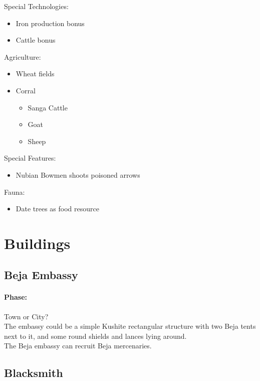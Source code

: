 \documentclass[a4paper,12pt]{scrreprt}
\begin{document}
Special Technologies:

\begin{itemize}
	\item Iron production bonus
	\item Cattle bonus
\end{itemize}

Agriculture:

\begin{itemize}
	\item Wheat fields
	\item Corral
	\begin{itemize}
		\item Sanga Cattle
		\item Goat
		\item Sheep
	\end{itemize}
\end{itemize}
Special Features:

\begin{itemize}
	\item Nubian Bowmen shoots poisoned arrows
\end{itemize}

Fauna:

\begin{itemize}
	\item Date trees as food resource
\end{itemize}

\section{Buildings}

\subsection{Beja Embassy}

\paragraph{Phase:} Town or City?\\

The embassy could be a simple Kushite rectangular structure with two Beja tents next to it, and some round shields and lances lying around.\\

The Beja embassy can recruit Beja mercenaries.

\subsection{Blacksmith}
\end{document}
